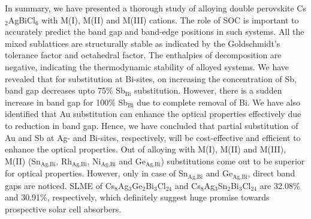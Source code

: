 \documentclass[journal=jpclcd,manuscript=letter]{achemso}
\begin{document}
In summary, we have presented a thorough study of alloying double perovskite Cs$_2$AgBiCl$_6$  with M(I), M(II) and M(III) cations. %
The role of SOC is important to accurately predict the band gap and band-edge positions in such systems. All the mixed sublattices are structurally stable as indicated by the Goldschmidt's tolerance factor and octahedral factor. The enthalpies of decomposition are negative, indicating the thermodynamic stability of alloyed systems. %
We have revealed that for substitution at Bi-sites, on increasing the concentration of Sb, band gap decreases upto 75\% Sb$_{\textrm{Bi}}$ substitution. However, there is a sudden increase in band gap for 100\% Sb$_{\textrm{Bi}}$ due to complete removal of Bi. We have also identified that Au substitution can enhance the optical properties effectively due to reduction in band gap. Hence, we have concluded that partial substitution of Au and Sb at Ag- and Bi-sites, respectively, will be cost-effective and efficient to enhance the optical properties. Out of alloying with M(I), M(II) and M(III), M(II) (Sn$_{\textrm{Ag},\textrm{Bi}}$, Rh$_{\textrm{Ag},\textrm{Bi}}$, Ni$_{\textrm{Ag},\textrm{Bi}}$ and Ge$_{\textrm{Ag},\textrm{Bi}}$) substitutions come out to be superior for optical properties. However, only in case of Sn$_{\textrm{Ag},\textrm{Bi}}$ and Ge$_{\textrm{Ag},\textrm{Bi}}$, direct band gaps are noticed. SLME of Cs$_8$Ag$_{3}$Ge$_{2}$Bi$_{3}$Cl$_{24}$ and Cs$_8$Ag$_{3}$Sn$_{2}$Bi$_{3}$Cl$_{24}$ are 32.08\% and 30.91\%, respectively, which definitely suggest huge promise towards prospective solar cell absorbers. 

\end{document}
